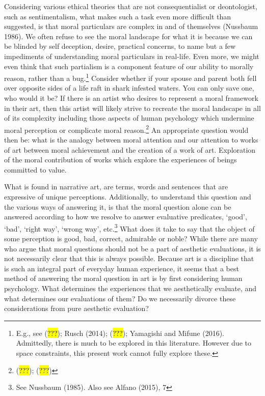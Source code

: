 \documentclass[
  letterpaper,
  DIV=11,
  numbers=noendperiod]{scrartcl}
\theoremstyle{remark}
\begin{document}
Considering various ethical theories that are not consequentialist or
deontologist, such as sentimentalism, what makes such a task even more
difficult than suggested, is that moral particulars are complex in and
of themselves (Nussbaum 1986). We often refuse to see the moral
landscape for what it is because we can be blinded by self deception,
desire, practical concerns, to name but a few impediments of
understanding moral particulars in real-life. Even more, we might even
think that such partialism is a component feature of our ability to
morally reason, rather than a bug.\footnote{E.g., see (\hl{???}); Rusch
  (2014); (\hl{???}); Yamagishi and Mifune (2016). Admittedly, there is
  much to be explored in this literature. However due to space
  constraints, this present work cannot fully explore these.} Consider
whether if your spouse and parent both fell over opposite sides of a
life raft in shark infested waters. You can only save one, who would it
be? If there is an artist who desires to represent a moral framework in
their art, then this artist will likely strive to recreate the moral
landscape in all of its complexity including those aspects of human
psychology which undermine moral perception or complicate moral
reason.\footnote{(\hl{???}); (\hl{???})} An appropriate question would
then be: what is the analogy between moral attention and our attention
to works of art between moral achievement and the creation of a work of
art. Exploration of the moral contribution of works which explore the
experiences of beings committed to value.

What is found in narrative art, are terms, words and sentences that are
expressive of unique perceptions. Additionally, to understand this
question and the various ways of answering it, is that the moral
question alone can be answered according to how we resolve to answer
evaluative predicates, `good', `bad', `right way', `wrong way',
etc.\footnote{See Nussbaum (1985). Also see Alfano (2015), 7} What does
it take to say that the object of some perception is good, bad, correct,
admirable or noble? While there are many who argue that moral questions
should not be a part of aesthetic evaluations, it is not necessarily
clear that this is always possible. Because art is a discipline that is
such an integral part of everyday human experience, it seems that a best
method of answering the moral question in art is by first considering
human psychology. What determines the experiences that we aesthetically
evaluate, and what determines our evaluations of them? Do we necessarily
divorce these considerations from pure aesthetic evaluation?
\end{document}
